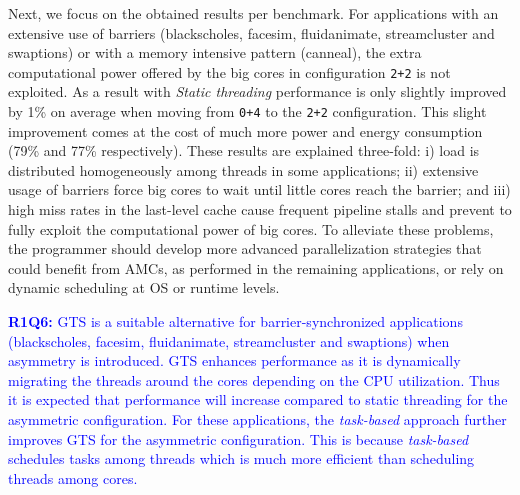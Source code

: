 
Next, we focus on the obtained results per benchmark. 
For applications with an extensive use of barriers (blackscholes, facesim, fluidanimate, streamcluster and swaptions) or with a memory intensive pattern (canneal), the extra computational power offered by the big cores in configuration \texttt{2+2} is not exploited. 
As a result with \emph{Static threading} performance is only slightly improved by 1\% on average when moving from \texttt{0+4} to the \texttt{2+2} configuration. 
This slight improvement comes at the cost of much more power and energy consumption (79\% and 77\% respectively).
These results are explained three-fold: i) load is distributed homogeneously among threads in some 
applications; ii) extensive usage of barriers force big cores to wait until little cores reach the 
barrier; and iii) high miss rates in the last-level cache cause frequent pipeline stalls and prevent 
to fully exploit the computational power of big cores. 
To alleviate these problems, the programmer should develop more advanced parallelization strategies that could benefit from AMCs, as performed in the remaining applications, or rely on dynamic scheduling at OS or runtime levels.

\textcolor{blue}{
\textbf{R1Q6:} GTS is a suitable alternative for barrier-synchronized applications (blackscholes, facesim, fluidanimate, streamcluster and swaptions) when asymmetry is introduced. 
GTS enhances performance as it is dynamically migrating the threads around the cores depending on the CPU utilization.
Thus it is expected that performance will increase compared to static threading for the asymmetric configuration. 
For these applications, the \emph{task-based} approach further improves GTS for the asymmetric configuration.
This is because \emph{task-based} schedules tasks among threads which is much more efficient than scheduling threads among cores.
}

